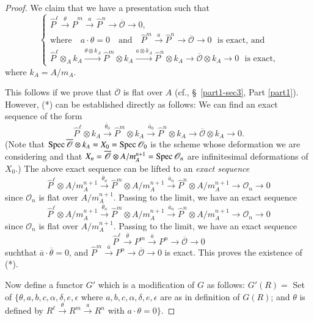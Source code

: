 \begin{proof}
We claim that we have a presentation such that
\begin{equation*}
\begin{cases}
\hat{P}^{\ell}\xrightarrow{\theta}\hat{P}^{m}\xrightarrow{a}\hat{P}^{n}\to
\overline{\mathscr{O}}\to 0,\\
\text{where}\quad a\cdot \theta=0\quad\text{and}\quad
\hat{P}^{m}\xrightarrow{a}\hat{P}^{n}\to \overline{\mathscr{O}}\to
0\text{~ is exact, and}\\
\hat{P}^{\ell}\otimes_{A}k_{A}\xrightarrow{\theta\otimes
  k_{A}}\hat{P}^{m}\otimes k_{A}\xrightarrow{a\otimes
  k_{A}}\hat{P}^{n}\otimes k_{A}\to \overline{\mathscr{O}}\otimes
k_{A}\to 0\text{~ is exact,}
\end{cases}\tag{*}
\end{equation*}
where $k_{A}=A/m_{A}$.

This follows if we prove that $\overline{\mathscr{O}}$ is flat over
$A$ (cf., \S\ \ref{part1-sec3}, Part \ref{part1}). However, (*) can be
established directly as follows: We can find an exact sequence of the
form
$$
\hat{P}^{\ell}\otimes
k_{A}\xrightarrow{\overline{\theta}_{0}}\hat{P}^{m}\otimes
k_{A}\xrightarrow{\overline{a}_{0}}\hat{P}^{n}\otimes k_{A}\to
\overline{\mathscr{O}}\otimes k_{A}\to 0.
$$
(Note that $\operatorname{Spec} \overline{\mathscr{O}}\otimes
k_{A}=X_{0}=\operatorname{Spec}\mathscr{O}_{0}$ is the scheme whose deformation we
are considering and that $X_{n}=\overline{\mathscr{O}}\otimes
A/m^{n+1}_{A}=\operatorname{Spec} \mathscr{O}_{n}$ are infinitesimal deformations of
$X_{0}$.) The above exact sequence can be lifted to an {\em exact
  sequence}
$$
\hat{P}^{\ell}\otimes
A/m^{n+1}_{A}\xrightarrow{\overline{\theta}_{n}}\hat{P}^{m}\otimes
A/m^{n+1}_{A}\xrightarrow{\overline{a}_{n}}\hat{P}^{n}\otimes
A/m^{n+1}_{A}\to \mathscr{O}_{n}\to 0
$$
since $\mathscr{O}_{n}$ is flat over $A/m^{n+1}_{A}$. Passing to the
limit, we have an exact sequence
$$
\hat{P}^{\ell}\otimes
A/m^{n+1}_{A}\xrightarrow{\overline{\theta}_{n}}\hat{P}^{m}\otimes
A/m^{n+1}_{A}\xrightarrow{\overline{a}_{n}}\hat{P}^{n}\otimes
A/m^{n+1}_{A}\to \mathscr{O}_{n}\to 0
$$
since $\mathscr{O}_{n}$ is flat over $A/m^{n+1}_{A}$. Passing to the
limit, we have an exact sequence
$$
\hat{P}^{\ell}\xrightarrow{\overline{\theta}}P^{m}\xrightarrow{\overline{a}}P^{n}\to
\overline{\mathscr{O}}\to 0
$$
such\pageoriginale that $\overline{a}\cdot \overline{\theta}=0$, and
$\hat{P}^{m}\xrightarrow{\overline{a}}P^{n}\to
\overline{\mathscr{O}}\to 0$ is exact. This proves the existence of
(*).

Now define a functor $G'$ which is a modification of $G$ as follows:
$G'(R)=$ Set of $\{\theta,a,b,c,\alpha,\delta,e, \epsilon$ where
$a,b,c,\alpha,\delta,e,\epsilon$ are as in definition of  $G(R)$; and
$\theta$ is defined by
$R^{\ell}\xrightarrow{\theta}R^{m}\xrightarrow{a}R^{n}$ with
$a\cdot\theta=0\}$. 


\end{proof}
